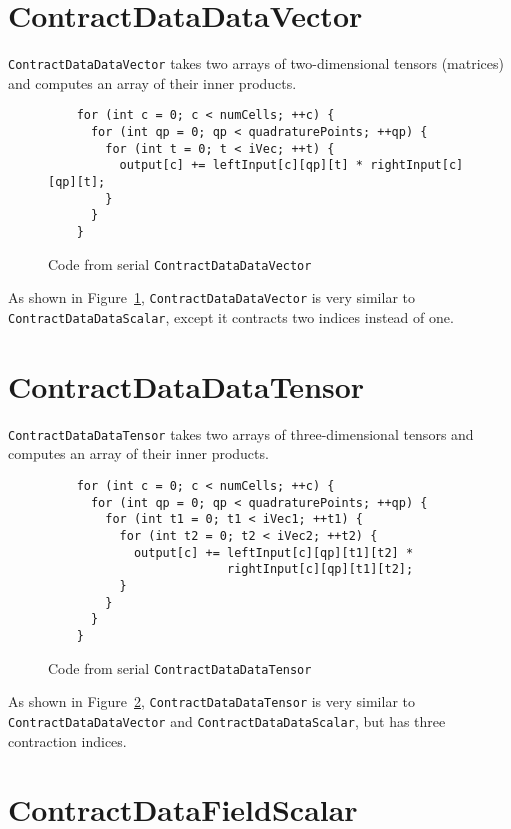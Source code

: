 \section{ContractDataDataVector}
\texttt{ContractDataDataVector} takes two arrays of two-dimensional tensors
(matrices) and computes an array of their inner products.
\begin{figure}[ht]
    \begin{lstlisting}
    for (int c = 0; c < numCells; ++c) {
      for (int qp = 0; qp < quadraturePoints; ++qp) {
        for (int t = 0; t < iVec; ++t) {
          output[c] += leftInput[c][qp][t] * rightInput[c][qp][t];
        }
      }
    }
    \end{lstlisting}
\caption{Code from serial \texttt{ContractDataDataVector}
\label{lst:ContractDataDataVectorSerial}} 
\end{figure}

As shown in Figure~\ref{lst:ContractDataDataVectorSerial},
\texttt{ContractDataDataVector} is very similar to
\texttt{ContractDataDataScalar}, except it contracts two indices instead of
one.

\section{ContractDataDataTensor}
\texttt{ContractDataDataTensor} takes two arrays of three-dimensional tensors
and computes an array of their inner products.

\begin{figure}[ht]
    \begin{lstlisting}
    for (int c = 0; c < numCells; ++c) {
      for (int qp = 0; qp < quadraturePoints; ++qp) {
        for (int t1 = 0; t1 < iVec1; ++t1) {
          for (int t2 = 0; t2 < iVec2; ++t2) {
            output[c] += leftInput[c][qp][t1][t2] * 
                         rightInput[c][qp][t1][t2];
          }
        }
      }
    }
    \end{lstlisting}
\caption{Code from serial \texttt{ContractDataDataTensor}
\label{lst:ContractDataDataTensorSerial}} 
\end{figure}

As shown in Figure~\ref{lst:ContractDataDataTensorSerial},
\texttt{ContractDataDataTensor} is very similar to\\
\texttt{ContractDataDataVector} and \texttt{ContractDataDataScalar}, but has
three contraction indices.

\section{ContractDataFieldScalar}


